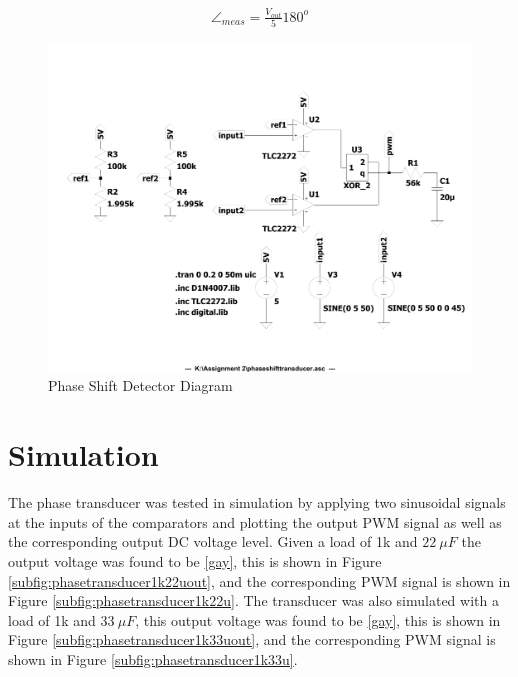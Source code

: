 \begin{align}
    \angle_{meas} =\frac{V_{out}}{5} 180^o
   \label{eq:angle_calc}
\end{align}

\begin{figure}[h!]
    \centering
    \includegraphics[width = 0.65\linewidth]{Figures/phaseshifttransducer.pdf}
        \caption{Phase Shift Detector Diagram}
    \label{fig:phaseshiftdetector.pdf}
\end{figure}

\section{Simulation} \label{sec:simulation_phasetransducer}
The phase transducer was tested in simulation by applying two sinusoidal signals at the inputs of the comparators and plotting the output PWM signal as well as the corresponding output DC voltage level. Given a load of 1k and $\SI{22}{\mu F}$ the output voltage was found to be \ref{gay}, this is shown in Figure \ref{subfig:phasetransducer1k22uout}, and the corresponding PWM signal is shown in Figure \ref{subfig:phasetransducer1k22u}. The transducer was also simulated with a load of 1k and $\SI{33}{\mu F}$, this output voltage was found to be \ref{gay}, this is shown in Figure \ref{subfig:phasetransducer1k33uout}, and the corresponding PWM signal is shown in Figure \ref{subfig:phasetransducer1k33u}. 

